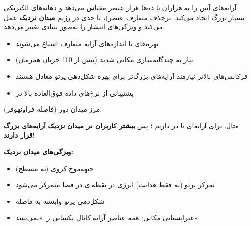 

\CNchained{}

\CNchained{}

 آرایه‌های آنتن را به هزاران یا ده‌ها هزار عنصر مقیاس می‌دهد و دهانه‌های الکتریکی بسیار بزرگ ایجاد می‌کند. برخلاف  متعارف  عنصر)،  تا حدی در رژیم \textbf{میدان نزدیک} عمل می‌کند و ویژگی‌های انتشار را به‌طور بنیادی تغییر می‌دهد.


\begin{itemize}
\tightlist
\item
  بهره‌های  با اندازه‌های آرایه متعارف اشباع می‌شوند
\item
  نیاز به چندگانه‌سازی مکانی شدید (بیش از 100 جریان همزمان)
\item
  فرکانس‌های بالاتر نیازمند آرایه‌های بزرگ‌تر برای بهره شکل‌دهی پرتو معادل هستند
\item
  پشتیبانی از نرخ‌های داده فوق‌العاده بالا در 
\end{itemize}


مرز میدان دور (فاصله فراونهوفر):


مثال: برای آرایه‌ای با  در  داریم ؛ پس \textbf{بیشتر کاربران در میدان نزدیک آرایه‌های بزرگ قرار دارند!}

\textbf{ویژگی‌های میدان نزدیک:}

\begin{itemize}
\tightlist
\item
  جبهه‌موج کروی (نه مسطح)
\item
  تمرکز پرتو (نه فقط هدایت)  انرژی در نقطه‌ای در فضا متمرکز می‌شود
\item
  شکل‌دهی پرتو وابسته به فاصله
\item
  غیرایستایی مکانی: همه عناصر آرایه کانال یکسانی را «نمی‌بینند»
\end{itemize}



